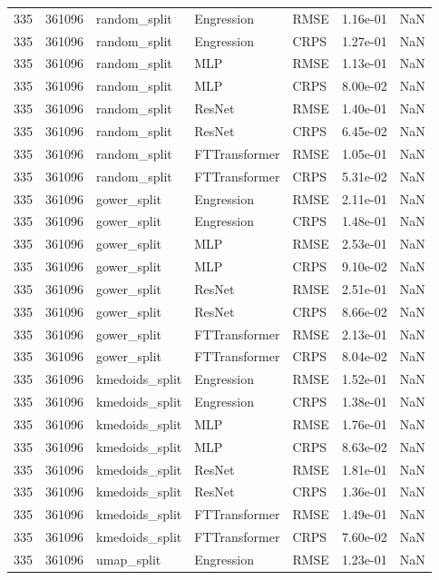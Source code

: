 \begin{tabular}{rrlllrr}
335 & 361096 & random\_split & Engression & RMSE & 1.16e-01 & NaN \\
335 & 361096 & random\_split & Engression & CRPS & 1.27e-01 & NaN \\
335 & 361096 & random\_split & MLP & RMSE & 1.13e-01 & NaN \\
335 & 361096 & random\_split & MLP & CRPS & 8.00e-02 & NaN \\
335 & 361096 & random\_split & ResNet & RMSE & 1.40e-01 & NaN \\
335 & 361096 & random\_split & ResNet & CRPS & 6.45e-02 & NaN \\
335 & 361096 & random\_split & FTTransformer & RMSE & 1.05e-01 & NaN \\
335 & 361096 & random\_split & FTTransformer & CRPS & 5.31e-02 & NaN \\
335 & 361096 & gower\_split & Engression & RMSE & 2.11e-01 & NaN \\
335 & 361096 & gower\_split & Engression & CRPS & 1.48e-01 & NaN \\
335 & 361096 & gower\_split & MLP & RMSE & 2.53e-01 & NaN \\
335 & 361096 & gower\_split & MLP & CRPS & 9.10e-02 & NaN \\
335 & 361096 & gower\_split & ResNet & RMSE & 2.51e-01 & NaN \\
335 & 361096 & gower\_split & ResNet & CRPS & 8.66e-02 & NaN \\
335 & 361096 & gower\_split & FTTransformer & RMSE & 2.13e-01 & NaN \\
335 & 361096 & gower\_split & FTTransformer & CRPS & 8.04e-02 & NaN \\
335 & 361096 & kmedoids\_split & Engression & RMSE & 1.52e-01 & NaN \\
335 & 361096 & kmedoids\_split & Engression & CRPS & 1.38e-01 & NaN \\
335 & 361096 & kmedoids\_split & MLP & RMSE & 1.76e-01 & NaN \\
335 & 361096 & kmedoids\_split & MLP & CRPS & 8.63e-02 & NaN \\
335 & 361096 & kmedoids\_split & ResNet & RMSE & 1.81e-01 & NaN \\
335 & 361096 & kmedoids\_split & ResNet & CRPS & 1.36e-01 & NaN \\
335 & 361096 & kmedoids\_split & FTTransformer & RMSE & 1.49e-01 & NaN \\
335 & 361096 & kmedoids\_split & FTTransformer & CRPS & 7.60e-02 & NaN \\
335 & 361096 & umap\_split & Engression & RMSE & 1.23e-01 & NaN \\

\end{tabular}
